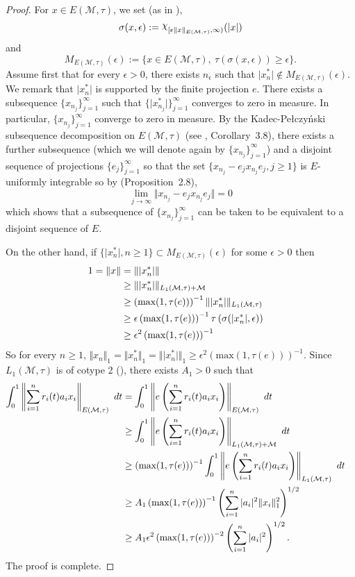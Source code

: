 \documentclass[12pt]{amsart}
\let\cal\mathcal
\def\m{{\cal M}}
\def\ch{\raise 0.5ex \hbox{$\chi$}}
\numberwithin{equation}{section}
\numberwithin{theorem}{section}
\begin{document}
\begin{proof}
For $x \in E(\m,\tau)$, we set (as in \cite{SU}),
$$\sigma(x,\epsilon):= 
\ch_{[\epsilon\Vert x \Vert_{E(\m,\tau)}, \infty)}(\vert x \vert) $$
and
$$ M_{E(\m,\tau)}(\epsilon):=\{ x \in E(\m,\tau),\ 
\tau(\sigma(x,\epsilon))\geq \epsilon \}.$$
Assume first that for every $\epsilon >0$, there exists $n_\epsilon$ such that 
$\vert x_{n}^*\vert \notin M_{E(\m,\tau)}(\epsilon)$. We remark that
$\vert x_{n}^*\vert$ is supported by the finite projection $e$. There exists
a subsequence $\{x_{n_j}\}_{j=1}^\infty$ such that 
$\{\vert x_{n_j}^*\vert\}_{j=1}^\infty$ converges
to zero in measure. In particular, $\{x_{n_j}\}_{j=1}^\infty$ converge 
to zero in measure.
By the Kadec-Pe\l czy\'nski subsequence decomposition on $E(\m,\tau)$
(see \cite{Ran10}, Corollary~3.8),
 there exists a 
further subsequence (which we will denote again by $\{x_{n_j}\}_{j=1}^\infty$) and a
disjoint sequence of projections $\{e_j\}_{j=1}^\infty$ so that the set 
$\{x_{n_j} -e_j x_{n_j}e_j, j\geq 1\}$ is $E$-uniformly integrable so by
\cite{Ran10}(Proposition~2.8),
$$\lim_{j \to \infty}\Vert x_{n_j} -e_j x_{n_j}e_j \Vert =0$$
which shows that a subsequence of $\{x_{n_j}\}_{j=1}^\infty$ can be taken to be 
equivalent to a disjoint sequence of $E$.

On the other hand, if $\{\vert x_{n}^*\vert, n\geq 1\} \subset 
M_{E(\m,\tau)}(\epsilon)$ for some $\epsilon >0$ then
\begin{equation*}
\begin{split}
1=\Vert x \Vert &= \Vert \vert x_{n}^*\vert \Vert \cr
&\geq \Vert \vert x_{n}^*\vert \Vert_{L_1(\m,\tau) + \m} \cr
&\geq \left( \text{max}(1,\tau(e))\right)^{-1}
 \Vert \vert x_{n}^*\vert \Vert_{L_1(\m,\tau)} \cr
&\geq \epsilon \left( \text{max}(1,\tau(e))\right)^{-1}
 \tau\left(\sigma(\vert x_{n}^*\vert,\epsilon)\right) \cr
&\geq \epsilon^2 \left( \text{max}(1,\tau(e))\right)^{-1}
\end{split}
\end{equation*}
So for every $n\geq 1$, $\Vert x_n \Vert_1 = \Vert x_{n}^* \Vert_1 =
\Vert \vert x_{n}^*\vert \Vert_1 \geq 
\epsilon^2 \left( \text{max}(1,\tau(e))\right)^{-1}$.
Since $L_1(\m,\tau)$ is of cotype 2 (\cite{TJ2}), there exists $A_1>0$ such that
\begin{equation*}
\begin{split}
\int_{0}^1 \left\Vert \sum_{i=1}^n r_i(t)a_i x_i \right\Vert_{E(\m,\tau)}
 \ dt 
&=\int_{0}^1 \left\Vert e\left(\sum_{i=1}^n r_i(t)a_i x_i \right)
\right\Vert_{E(\m,\tau)} \ dt \cr
&\geq \int_{0}^1 \left\Vert e\left(\sum_{i=1}^n r_i(t)a_i x_i \right)
\right\Vert_{L_1(\m,\tau) + \m} \ dt \cr
&\geq \left( \text{max}(1,\tau(e))\right)^{-1}
\int_{0}^1 \left\Vert e\left(\sum_{i=1}^n r_i(t)a_i x_i \right)
\right\Vert_{L_1(\m,\tau)} \ dt \cr
&\geq A_1 \left( \text{max}(1,\tau(e))\right)^{-1}
\left(\sum_{i=1}^n \vert a_i \vert^2 \Vert x_i \Vert_{1}^2 \right)^{1/2} \cr
&\geq A_1 \epsilon^2 \left( \text{max}(1,\tau(e))\right)^{-2}
\left(\sum_{i=1}^n \vert a_i \vert^2 \right)^{1/2}.
\end{split}
\end{equation*}
The proof is complete.
\end{proof}
\end{document}
